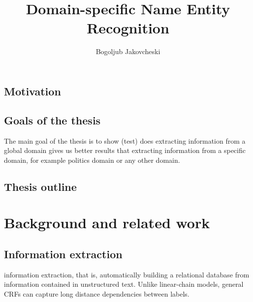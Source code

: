 \documentclass[thesis=M,english]{FITthesis}[2012/10/20]
\title{Domain-specific Name Entity Recognition}
\author{Bogoljub Jakovcheski} %
\begin{document}

\begin{introduction}

\section{Motivation}

\section{Goals of the thesis}
	The main goal of the thesis is to show (test) does extracting information from a 	global domain gives us better results that extracting information from a specific domain, for example politics domain or any other domain.
\section{Thesis outline}
	
\end{introduction}

\chapter{Background and related work}\label{textcompr}

	

\section{Information extraction}
information extraction, that is, automatically building a relational database from information contained in unstructured text. Unlike linear-chain models, general CRFs can capture long distance dependencies between labels. 
\end{document}
